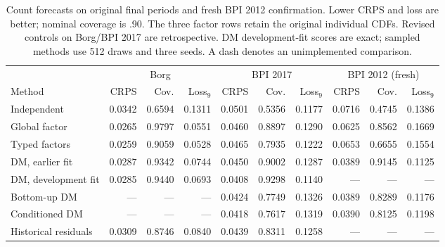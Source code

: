\begin{table}[t]\centering\small
\caption{Count forecasts on original final periods and fresh BPI 2012 confirmation. Lower CRPS and loss are better; nominal coverage is .90. The three factor rows retain the original individual CDFs. Revised controls on Borg/BPI 2017 are retrospective. DM development-fit scores are exact; sampled methods use 512 draws and three seeds. A dash denotes an unimplemented comparison.}\label{tab:counts}
\begin{tabular}{lrrr rrr rrr}\toprule
&\multicolumn{3}{c}{Borg}&\multicolumn{3}{c}{BPI 2017}&\multicolumn{3}{c}{BPI 2012 (fresh)}\\
Method&CRPS&Cov.&Loss$_9$&CRPS&Cov.&Loss$_9$&CRPS&Cov.&Loss$_9$\\\midrule
Independent&0.0342&0.6594&0.1311&0.0501&0.5356&0.1177&0.0716&0.4745&0.1386\\
Global factor&0.0265&0.9797&0.0551&0.0460&0.8897&0.1290&0.0625&0.8562&0.1669\\
Typed factors&0.0259&0.9059&0.0528&0.0465&0.7935&0.1222&0.0653&0.6655&0.1554\\
DM, earlier fit&0.0287&0.9342&0.0744&0.0450&0.9002&0.1287&0.0389&0.9145&0.1125\\
DM, development fit&0.0285&0.9440&0.0693&0.0408&0.9298&0.1140&---&---&---\\
Bottom-up DM&---&---&---&0.0424&0.7749&0.1326&0.0389&0.8289&0.1176\\
Conditioned DM&---&---&---&0.0418&0.7617&0.1319&0.0390&0.8125&0.1198\\
Historical residuals&0.0309&0.8746&0.0840&0.0439&0.8311&0.1258&---&---&---\\
\bottomrule\end{tabular}\end{table}
